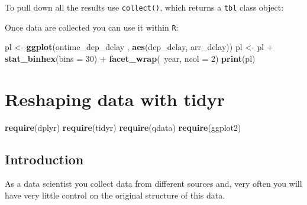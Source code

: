 \documentclass[]{book}
\newenvironment{Shaded}{\begin{snugshade}}{\end{snugshade}}
\newcommand{\KeywordTok}[1]{\textcolor[rgb]{0.13,0.29,0.53}{\textbf{{#1}}}}
\newcommand{\DataTypeTok}[1]{\textcolor[rgb]{0.13,0.29,0.53}{{#1}}}
\newcommand{\DecValTok}[1]{\textcolor[rgb]{0.00,0.00,0.81}{{#1}}}
\newcommand{\StringTok}[1]{\textcolor[rgb]{0.31,0.60,0.02}{{#1}}}
\newcommand{\NormalTok}[1]{{#1}}
\begin{document}
To pull down all the results use \texttt{collect()}, which returns a
\texttt{tbl} class object:

\begin{Shaded}
\end{Shaded}

Once data are collected you can use it within \texttt{R}:

\begin{Shaded}
\begin{Highlighting}[]
\NormalTok{pl <-}\StringTok{ }\KeywordTok{ggplot}\NormalTok{(ontime_dep_delay , }\KeywordTok{aes}\NormalTok{(dep_delay, arr_delay))}
\NormalTok{pl <-}\StringTok{ }\NormalTok{pl +}\StringTok{ }\KeywordTok{stat_binhex}\NormalTok{(}\DataTypeTok{bins =} \DecValTok{30}\NormalTok{) +}\StringTok{ }\KeywordTok{facet_wrap}\NormalTok{(~year, }\DataTypeTok{ncol =} \DecValTok{2}\NormalTok{)}
\KeywordTok{print}\NormalTok{(pl)}
\end{Highlighting}
\end{Shaded}

\chapter{Reshaping data with tidyr}\label{reshaping-data-with-tidyr}

\begin{Shaded}
\begin{Highlighting}[]
\KeywordTok{require}\NormalTok{(dplyr)}
\KeywordTok{require}\NormalTok{(tidyr)}
\KeywordTok{require}\NormalTok{(qdata)}
\KeywordTok{require}\NormalTok{(ggplot2)}
\end{Highlighting}
\end{Shaded}

\section{Introduction}\label{introduction-1}

As a data scientist you collect data from different sources and, very
often you will have very little control on the original structure of
this data.
\end{document}
